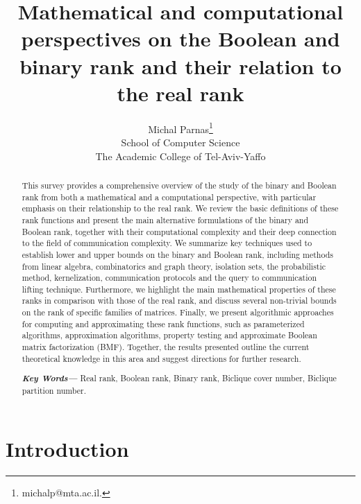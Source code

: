 \documentclass[11pt]{article}
\providecommand{\keywords}[1]{\textbf{\textit{Key Words---}} #1}
\begin{document}
\title{Mathematical and computational perspectives on the Boolean and binary rank and their relation to the real rank }
\author{Michal Parnas\thanks{michalp@mta.ac.il.} \\
School of Computer Science \\
   The Academic College of Tel-Aviv-Yaffo \\
}
\date{}

\maketitle

\begin{abstract}
This survey provides a comprehensive overview of the study of the binary and Boolean rank from both a mathematical and a computational perspective, with particular
emphasis on their relationship to the real rank.
We review the basic definitions of these rank functions and present the main alternative formulations of the binary and Boolean rank,
together with their computational complexity and their deep connection to the field of communication complexity.
We summarize key techniques used to establish lower and upper bounds on the binary and Boolean rank,
including  methods from linear algebra, combinatorics and graph theory, isolation sets,
the probabilistic method, kernelization, communication protocols and the query to communication lifting technique.
Furthermore, we highlight the main mathematical properties of these ranks in comparison with those of the real rank,
and discuss several non-trivial bounds on the rank of specific families of matrices.
Finally, we present algorithmic approaches for computing and approximating these rank functions,
such as parameterized algorithms, approximation algorithms, property testing and approximate Boolean matrix factorization (BMF).
Together, the results presented outline the current theoretical knowledge in this area and suggest directions for further research.

\keywords{Real rank, Boolean rank,  Binary rank,   Biclique cover number,  Biclique partition number.}

\end{abstract}

\newpage

\tableofcontents
\newpage

\section{Introduction}
\end{document}
